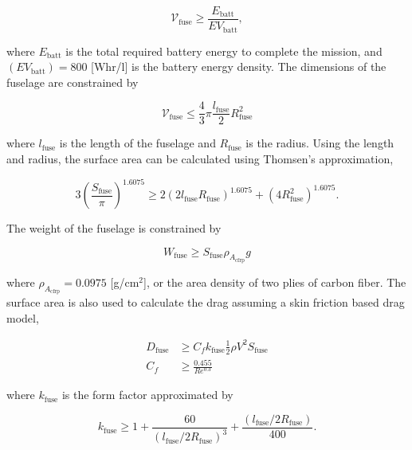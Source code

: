 \documentclass[]{aiaa-tc}%
\begin{document}
\begin{equation}
    \label{e:fusevol}
    \mathcal{V}_{\text{fuse}} \geq \frac{E_{\mathrm{batt}}} {EV_{\mathrm{batt}}}, 
\end{equation}

where $E_{\mathrm{batt}}$ is the total required battery energy to complete the mission, and $(EV_{\mathrm{batt}}) = 800 $ [Whr/l] is the battery energy density. 
The dimensions of the fuselage are constrained by

\begin{equation}
    \label{e:fusevol2}
    \mathcal{V}_{\text{fuse}} \leq \frac{4}{3}\pi \frac{l_{\text{fuse}}}{2}R_{\text{fuse}}^2
\end{equation}

where $l_{\text{fuse}}$ is the length of the fuselage and $R_{\text{fuse}}$ is the radius. Using the length and radius, the surface area can be calculated using Thomsen's approximation,\cite{ellipsoidSA}

\begin{equation}
    \label{e:fusesa}
    3 \left( \frac{S_{\text{fuse}}}{\pi} \right)^{1.6075} \geq 2(2l_{\text{fuse}}R_{\text{fuse}})^{1.6075} + (4R_{\text{fuse}}^2)^{1.6075}.
\end{equation}

The weight of the fuselage is constrained by

\begin{equation}
    \label{e:fuseweight}
    W_{\text{fuse}} \geq S_{\text{fuse}} \rho_{A_{\text{cfrp}}} g
\end{equation} 

where $\rho_{A_{\text{cfrp}}} = 0.0975$ [g/cm$^2$], or the area density of two plies of carbon fiber.\cite{cfply}  The surface area is also used to calculate the drag assuming a skin friction based drag model,

\begin{align}
    \label{e:fusedrag}
    D_{\text{fuse}} &\geq C_f k_{\text{fuse}} \frac{1}{2} \rho V^2 S_{\text{fuse}} \\
    C_f &\geq \frac{0.455}{Re^{0.3}}
\end{align}

where $k_{\text{fuse}}$ is the form factor approximated by\cite{raymer}

\begin{equation}
    \label{e:fuseform}
    k_{\text{fuse}} \geq 1 + \frac{60}{(l_{\text{fuse}}/2R_{\text{fuse}})^3} + \frac{(l_{\text{fuse}}/2R_{\text{fuse}})}{400}.
\end{equation}
\end{document}
